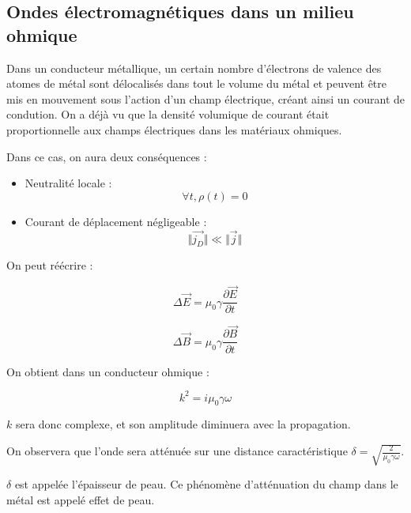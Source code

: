 \documentclass[a4paper,12pt]{book}
\newcommand{\Thr}[2]{\begin{tcolorbox}[sharp corners, colback=white,colframe=red!10!blue!30!green!75!, title=Théorème : #1]#2\end{tcolorbox}}
\renewcommand{\Vec}[1]{\overrightarrow{#1}}
\begin{document}
\subsection{Ondes électromagnétiques dans un milieu ohmique}
Dans un conducteur métallique, un certain nombre d'électrons de valence des atomes de métal sont délocalisés dans tout le volume du métal et peuvent être mis en mouvement sous l'action d'un champ électrique, créant ainsi un courant de condution. On a déjà vu que la densité volumique de courant était proportionnelle aux champs électriques dans les matériaux ohmiques.
\par Dans ce cas, on aura deux conséquences :\begin{itemize}
\item Neutralité locale : $$\forall t,\rho(t) = 0$$
\item Courant de déplacement négligeable : $$\Vert\Vec{j_D}\Vert\ll\Vert\Vec{j}\Vert$$
\end{itemize}
\Thr{Les équations de propagation dans le conducteur}{On peut réécrire :
\par $$\Delta \Vec{E} = \mu_0\gamma\dfrac{\partial\Vec{E}}{\partial t}$$
\par $$\Delta\Vec{B} =\mu_0\gamma\dfrac{\partial\Vec{B}}{\partial t}$$}
\Thr{Relation de dispersion}{On obtient dans un conducteur ohmique :
\par $$k^2 = i\mu_0\gamma\omega$$
\par $k$ sera donc complexe, et son amplitude diminuera avec la propagation.
\par On observera que l'onde sera atténuée sur une distance caractéristique $\delta = \sqrt{\frac{2}{\mu_0\gamma\omega}}$.
\par $\delta$ est appelée l'épaisseur de peau. Ce phénomène d'atténuation du champ dans le métal est appelé effet de peau.}
\end{document}
